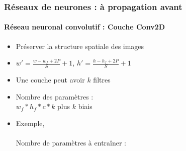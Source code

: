 \documentclass[xcolor=table]{beamer}
\begin{document}
\begin{frame}
\frametitle{Réseaux de neurones : à propagation avant}
\framesubtitle{Réseau neuronal convolutif : Couche Conv2D}

\begin{minipage}{0.60\textwidth} 
	\begin{itemize}
		\item Préserver la structure spatiale des images
		\item $ w' = \frac{w - w_f + 2P}{S} + 1$,  $ h' = \frac{h - h_f + 2P}{S} + 1$
		\item Une couche peut avoir $k$ filtres 
		\item Nombre des paramètres : \\$w_f * h_f * c * k$ plus $k$ biais
		\item Exemple,  \\ \\Nombre de paramètres à entraîner : 
	\end{itemize}
\end{minipage}
%
\begin{minipage}{0.39\textwidth}
	
\end{minipage}

\end{frame}
\end{document}

